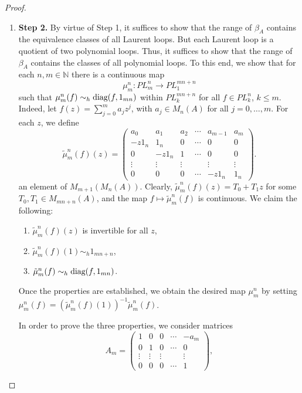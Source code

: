 \documentclass{book}
\def\diag{\textnormal{diag}}
\begin{document}
\begin{proof}
\begin{enumerate}[label={}]
\begin{enumerate}[label={}]
      and this implies that Laurent loops are a dense subset of invertible loops.
      \item \textbf{Step 2.} By virtue of Step 1, it suffices to show that the range of \(\beta_A\) contains the equivalence classes of all Laurent loops. But each Laurent loop is a quotient of two polynomial loops.
      Thus, it suffices to show that the range of \(\beta_A\) contains the classes of all polynomial loops. To this end, we show that for each \(n,m\in\mathbb{N}\) there is a continuous map
      \[
        \mu_m^n:PL_m^n\rightarrow PL_1^{mn+n}
      \] 
      such that \(\mu_m^n(f)\sim_h\diag(f,1_{mn})\) within \(PL_k^{mn+n}\) for all \(f\in PL_k^n\), \(k\leq m\). Indeed, let
      \(f(z)=\sum_{j=0}^{m}a_j z^j\), with \(a_j\in M_n(A)\) for all \(j=0,\ldots, m\). For each \(z\), we define
      \[
        \tilde{\mu}_m^n(f)(z)=\begin{pmatrix}
          a_0&a_1&a_2&\cdots & a_{m-1}&a_m\\
          -z1_n&1_n&0&\cdots &0&0\\
          0&-z1_n&1&\cdots&0&0\\
          \vdots&\vdots&\vdots&&\vdots&\vdots\\
          0&0&0&\cdots&-z1_n&1_n
        \end{pmatrix}.
      \]
      an element of \(M_{m+1}(M_n(A))\). Clearly, \(\tilde{\mu}_m^n(f)(z)=T_0+T_1 z\) for some \(T_0,T_1\in M_{mn+n}(A)\),
      and the map \(f\mapsto\tilde{\mu}_m^n(f)\) is continuous. We claim the following:
      \begin{enumerate}
        \item \(\tilde{\mu}_m^n(f)(z)\) is invertible for all \(z\),
        \item \(\tilde{\mu}_m^n(f)(1)\sim_h 1_{mn+n}\),
        \item \(\tilde{\mu}_m^n(f)\sim_h \diag(f,1_{mn})\).
      \end{enumerate}
      Once the properties are established, we obtain the desired map \(\mu_m^n\) by setting \(\mu_m^n(f)={(\tilde{\mu}_m^n(f)(1))}^{-1}\tilde{\mu}_m^n(f)\).\par
      In order to prove the three properties, we consider matrices
      \[ 
        A_m= \begin{pmatrix} 1&0&0&\cdots&-a_m\\ 0&1&0&\cdots&0\\ \vdots&\vdots&\vdots&&\vdots\\ 0&0&0&\cdots&1 \end{pmatrix},
\]
\end{enumerate}
\end{enumerate}
\end{proof}
\end{document}
